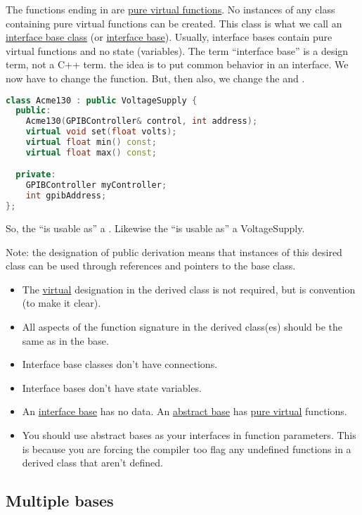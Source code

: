 The functions ending in  are \underline{pure virtual functions}. No instances of any class containing pure virtual functions can be created. This class is what we call an \underline{interface base class} (or \underline{interface base}). Usually, interface bases contain pure virtual functions and no state (variables). The term ``interface base'' is a design term, not a C++ term. the idea is to put common behavior in an interface. We now have to change the  function. But, then also, we change the  and .

\begin{lstlisting}[language=C++]
class Acme130 : public VoltageSupply {
  public:
    Acme130(GPIBController& control, int address);
    virtual void set(float volts);
    virtual float min() const;
    virtual float max() const;

  private:
    GPIBController myController;
    int gpibAddress;
};
\end{lstlisting}

So, the  ``is usable as'' a . Likewise the  ``is usable as'' a VoltageSupply. 

Note: the designation of public derivation means that instances of this desired class can be used through references and pointers to the base class.

\begin{itemize}
  \item The \underline{virtual} designation in the derived class is not required, but is convention (to make it clear). 
  \item All aspects of the function signature in the derived class(es) should be the same as in the base.
  \item Interface base classes don't have connections.
  \item Interface bases don't have state variables.
  \item An \underline{interface base} has no data. An \underline{abstract base} has \underline{pure virtual} functions.
  \item You should use abstract bases as your interfaces in function parameters. This is because you are forcing the compiler too flag any undefined functions in a derived class that aren't defined.
\end{itemize}

\subsection{Multiple bases}

